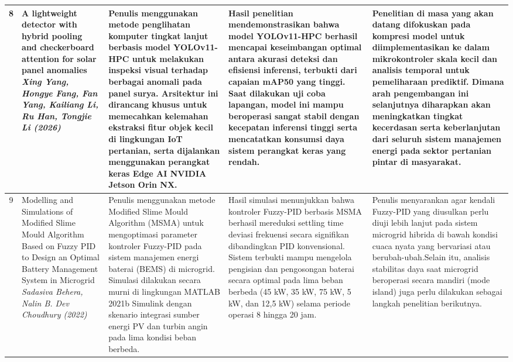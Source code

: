 \documentclass[11pt,a4paper]{article}
\begin{document}
\begin{small}
\begin{longtable}{|c|>{\raggedright\arraybackslash}p{3.2cm}|>{\raggedright\arraybackslash}p{4cm}|>{\raggedright\arraybackslash}p{4cm}|>{\raggedright\arraybackslash}p{4cm}|}
8 & A lightweight detector with hybrid pooling and checkerboard attention for solar panel anomalies \newline \newline \textit{Xing Yang, Hongye Fang, Fan Yang, Kailiang Li, Ru Han, Tongjie Li (2026)} & Penulis menggunakan metode penglihatan komputer tingkat lanjut berbasis model YOLOv11-HPC untuk melakukan inspeksi visual terhadap berbagai anomali pada panel surya. Arsitektur ini dirancang khusus untuk memecahkan kelemahan ekstraksi fitur objek kecil di lingkungan IoT pertanian, serta dijalankan menggunakan perangkat keras Edge AI NVIDIA Jetson Orin NX. & Hasil penelitian mendemonstrasikan bahwa model YOLOv11-HPC berhasil mencapai keseimbangan optimal antara akurasi deteksi dan efisiensi inferensi, terbukti dari capaian mAP50 yang tinggi. Saat dilakukan uji coba lapangan, model ini mampu beroperasi sangat stabil dengan kecepatan inferensi tinggi serta mencatatkan konsumsi daya sistem perangkat keras yang rendah. & Penelitian di masa yang akan datang difokuskan pada kompresi model untuk diimplementasikan ke dalam mikrokontroler skala kecil dan analisis temporal untuk pemeliharaan prediktif. Dimana arah pengembangan ini selanjutnya diharapkan akan meningkatkan tingkat kecerdasan serta keberlanjutan dari seluruh sistem manajemen energi pada sektor pertanian pintar di masyarakat. \\
\hline

9 & Modelling and Simulations of Modified Slime Mould Algorithm Based on Fuzzy PID to Design an Optimal Battery Management System in Microgrid \newline \newline \textit{Sadasiva Behera, Nalin B. Dev Choudhury (2022)} & Penulis menggunakan metode Modified Slime Mould Algorithm (MSMA) untuk mengoptimasi parameter kontroler Fuzzy-PID pada sistem manajemen energi baterai (BEMS) di microgrid. Simulasi dilakukan secara murni di lingkungan MATLAB 2021b Simulink dengan skenario integrasi sumber energi PV dan turbin angin pada lima kondisi beban berbeda. & Hasil simulasi menunjukkan bahwa kontroler Fuzzy-PID berbasis MSMA berhasil mereduksi settling time deviasi frekuensi secara signifikan dibandingkan PID konvensional. Sistem terbukti mampu mengelola pengisian dan pengosongan baterai secara optimal pada lima beban berbeda (45 kW, 35 kW, 75 kW, 5 kW, dan 12,5 kW) selama periode operasi 8 hingga 20 jam. & Penulis menyarankan agar kendali Fuzzy-PID yang diusulkan perlu diuji lebih lanjut pada sistem microgrid hibrida di bawah kondisi cuaca nyata yang bervariasi atau berubah-ubah.Selain itu, analisis stabilitas daya saat microgrid beroperasi secara mandiri (mode island) juga perlu dilakukan sebagai langkah penelitian berikutnya. \\
\hline


\end{longtable}
\end{small}
\end{document}
